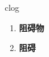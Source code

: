 
\begin{frame}
{\huge clog}
\begin{center}
\begin{enumerate}\Large
  \item \textbf{阻碍物}
  \item \textbf{阻碍}
\end{enumerate}
\end{center}
\end{frame}
